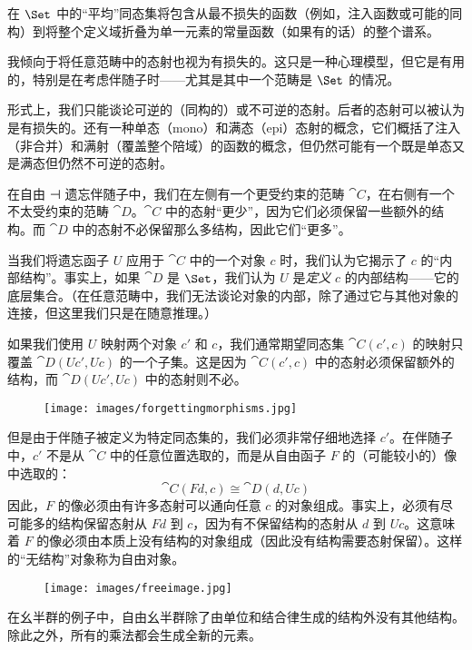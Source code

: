 在 $\Set$ 中的“平均”同态集将包含从最不损失的函数（例如，注入函数或可能的同构）到将整个定义域折叠为单一元素的常量函数（如果有的话）的整个谱系。

我倾向于将任意范畴中的态射也视为有损失的。这只是一种心理模型，但它是有用的，特别是在考虑伴随子时——尤其是其中一个范畴是 $\Set$ 的情况。

形式上，我们只能谈论可逆的（同构的）或不可逆的态射。后者的态射可以被认为是有损失的。还有一种单态（mono）和满态（epi）态射的概念，它们概括了注入（非合并）和满射（覆盖整个陪域）的函数的概念，但仍然可能有一个既是单态又是满态但仍然不可逆的态射。

在自由 ⊣ 遗忘伴随子中，我们在左侧有一个更受约束的范畴 $\cat{C}$，在右侧有一个不太受约束的范畴 $\cat{D}$。$\cat{C}$ 中的态射“更少”，因为它们必须保留一些额外的结构。而 $\cat{D}$ 中的态射不必保留那么多结构，因此它们“更多”。

当我们将遗忘函子 $U$ 应用于 $\cat{C}$ 中的一个对象 $c$ 时，我们认为它揭示了 $c$ 的“内部结构”。事实上，如果 $\cat{D}$ 是 $\Set$，我们认为 $U$ 是\emph{定义} $c$ 的内部结构——它的底层集合。（在任意范畴中，我们无法谈论对象的内部，除了通过它与其他对象的连接，但这里我们只是在随意推理。）

如果我们使用 $U$ 映射两个对象 $c'$ 和 $c$，我们通常期望同态集 $\cat{C}(c', c)$ 的映射只覆盖 $\cat{D}(U c', U c)$ 的一个子集。这是因为 $\cat{C}(c', c)$ 中的态射必须保留额外的结构，而 $\cat{D}(U c', U c)$ 中的态射则不必。

\begin{figure}[H]
  \centering
  \texttt{[image: images/forgettingmorphisms.jpg]}
\end{figure}

\noindent
但是由于伴随子被定义为特定同态集的，我们必须非常仔细地选择 $c'$。在伴随子中，$c'$ 不是从 $\cat{C}$ 中的任意位置选取的，而是从自由函子 $F$ 的（可能较小的）像中选取的：
\[\cat{C}(F d, c) \cong \cat{D}(d, U c)\]
因此，$F$ 的像必须由有许多态射可以通向任意 $c$ 的对象组成。事实上，必须有尽可能多的结构保留态射从 $F d$ 到 $c$，因为有不保留结构的态射从 $d$ 到 $U c$。这意味着 $F$ 的像必须由本质上没有结构的对象组成（因此没有结构需要态射保留）。这样的“无结构”对象称为自由对象。

\begin{figure}[H]
  \centering
  \texttt{[image: images/freeimage.jpg]}
\end{figure}

\noindent
在幺半群的例子中，自由幺半群除了由单位和结合律生成的结构外没有其他结构。除此之外，所有的乘法都会生成全新的元素。

